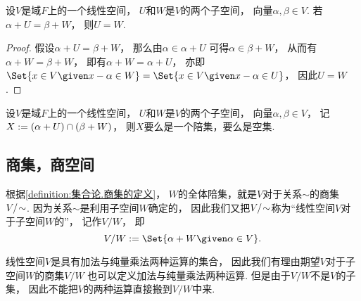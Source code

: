\begin{proposition}
设\(V\)是域\(F\)上的一个线性空间，
\(U\)和\(W\)是\(V\)的两个子空间，
向量\(\alpha,\beta \in V\).
若\(\alpha + U = \beta + W\)，
则\(U = W\).
\begin{proof}
假设\(\alpha + U = \beta + W\)，
那么由\(\alpha \in \alpha + U\)
可得\(\alpha \in \beta + W\)，
从而有\(\alpha + W = \beta + W\)，
即有\(\alpha + W = \alpha + U\)，
亦即\(
	\Set{
		x \in V
		\given
		x - \alpha \in W
	}
	= \Set{
		x \in V
		\given
		x - \alpha \in U
	}
\)，
因此\(U = W\).
\end{proof}
\end{proposition}

\begin{proposition}
设\(V\)是域\(F\)上的一个线性空间，
\(U\)和\(W\)是\(V\)的两个子空间，
向量\(\alpha,\beta \in V\)，
记\(X := (\alpha + U) \cap (\beta + W)\)，
则\(X\)要么是一个陪集，要么是空集.
\end{proposition}

\subsection{商集，商空间}
根据\cref{definition:集合论.商集的定义}，
\(W\)的全体陪集，就是\(V\)对于关系\(\sim\)的商集\(V/\kern-2pt\sim\).
因为关系\(\sim\)是利用子空间\(W\)确定的，
因此我们又把\(V/\kern-2pt\sim\)称为“线性空间\(V\)对于子空间\(W\)的”，
记作\(V/W\)，
即\begin{equation*}
	V/W
	\defeq
	\Set{ \alpha+W \given \alpha \in V }.
\end{equation*}

线性空间\(V\)是具有加法与纯量乘法两种运算的集合，
因此我们有理由期望\(V\)对于子空间\(W\)的商集\(V/W\)
也可以定义加法与纯量乘法两种运算.
但是由于\(V/W\)不是\(V\)的子集，
因此不能把\(V\)的两种运算直接搬到\(V/W\)中来.

